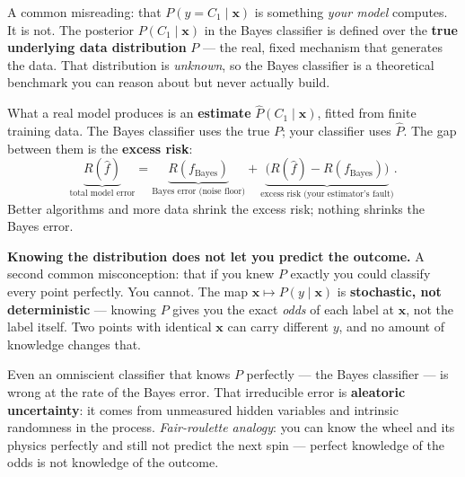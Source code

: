 \documentclass[11pt, a4paper]{article}
\begin{document}
\begin{pitfallbox}
A common misreading: that $P(y = C_1 \mid \mathbf{x})$ is something \emph{your model} computes. It is not. The posterior $P(C_1 \mid \mathbf{x})$ in the Bayes classifier is defined over the \textbf{true underlying data distribution} $P$ — the real, fixed mechanism that generates the data. That distribution is \emph{unknown}, so the Bayes classifier is a theoretical benchmark you can reason about but never actually build.

What a real model produces is an \textbf{estimate} $\hat{P}(C_1 \mid \mathbf{x})$, fitted from finite training data. The Bayes classifier uses the true $P$; your classifier uses $\hat{P}$. The gap between them is the \textbf{excess risk}:
\[
\underbrace{R(\hat{f})}_{\text{total model error}} = \underbrace{R(f_{\text{Bayes}})}_{\text{Bayes error (noise floor)}} + \underbrace{\big(R(\hat{f}) - R(f_{\text{Bayes}})\big)}_{\text{excess risk (your estimator's fault)}}.
\]
Better algorithms and more data shrink the excess risk; nothing shrinks the Bayes error.
\end{pitfallbox}

\begin{notebox}
\textbf{Knowing the distribution does not let you predict the outcome.} A second common misconception: that if you knew $P$ exactly you could classify every point perfectly. You cannot. The map $\mathbf{x} \mapsto P(y \mid \mathbf{x})$ is \textbf{stochastic, not deterministic} — knowing $P$ gives you the exact \emph{odds} of each label at $\mathbf{x}$, not the label itself. Two points with identical $\mathbf{x}$ can carry different $y$, and no amount of knowledge changes that.

Even an omniscient classifier that knows $P$ perfectly — the Bayes classifier — is wrong at the rate of the Bayes error. That irreducible error is \textbf{aleatoric uncertainty}: it comes from unmeasured hidden variables and intrinsic randomness in the process. \emph{Fair-roulette analogy}: you can know the wheel and its physics perfectly and still not predict the next spin — perfect knowledge of the odds is not knowledge of the outcome.
\end{notebox}
\end{document}

